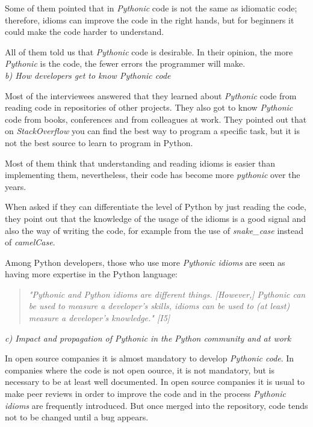 \documentclass[a4paper]{article}
\begin{document}
Some of them pointed that in \textit{Pythonic} code is not the same as idiomatic code; therefore, idioms can improve the code in the right hands, but for beginners it could make the code harder to understand.

All of them told us that \textit{Pythonic} code is desirable. In their opinion, the more \textit{Pythonic} is the code, the fewer errors the programmer will make.
\\

\textit{b) How developers get to know Pythonic code}

Most of the interviewees answered that they learned about \textit{Pythonic} code from reading code in repositories of other projects. They also got to know \textit{Pythonic} code from books, conferences and from colleagues at work.
They pointed out that on \textit{StackOverflow} you can find the best way to program a specific task, but it is not the best source to learn to program in Python.

Most of them think that understanding and reading idioms is easier than implementing them, nevertheless, their code has become more \textit{pythonic} over the years.

When asked if they can differentiate the level of Python by just reading the code, they point out that the knowledge of the usage of the idioms is a good signal and also the way of writing the code, for example from the use of \textit{snake\_case} instead of \textit{camelCase}.


Among Python developers, those who use more \textit{Pythonic idioms} are seen as having more expertise in the Python language:
\begin{quote}
\textit{
    "\textit{Pythonic} and Python idioms are different things. [However,] \textit{Pythonic} can be used to measure a developer’s skills, idioms can be used to (at least) measure a developer’s knowledge." [I5]
}
\end{quote}



\textit{c) Impact and propagation of Pythonic in the Python community and at work}

In open source companies it is almost mandatory to develop \textit{Pythonic code}. In companies where the code is not open oource, it is not mandatory, but is necessary to be at least well documented. In open source companies it is usual to make peer reviews in order to improve the code and in the process \textit{Pythonic idioms} are frequently introduced. But once merged into the repository, code tends not to be changed until a bug appears.
\end{document}
